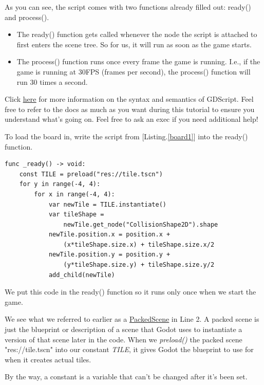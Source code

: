 \documentclass[14pt]{extarticle}
\newcommand{\prettyref}[2]{[{#1}.\ref{#2}]}
\begin{document}
As you can see, the script comes with two functions already filled out: ready() and process().
\begin{itemize}
    \item The ready() function gets called whenever the node the script is attached to first enters the scene tree. So for us, it will run as soon as the game starts.
    \item The process() function runs once every frame the game is running. I.e., if the game is running at 30FPS (frames per second), the process() function will run 30 times a second.
\end{itemize}
Click \href{https://docs.godotengine.org/en/stable/tutorials/scripting/gdscript/index.html#doc-gdscript}{\underline{here}} for more information on the syntax and semantics of GDScript. Feel free to refer to the docs as much as you want during this tutorial to ensure you understand what's going on. Feel free to ask an exec if you need additional help!

To load the board in, write the script from \prettyref{Listing}{board1} into the ready() function.

\begin{lstlisting}[language=gdscript, label={board1}, caption=The code for loading in the board]
func _ready() -> void:
    const TILE = preload("res://tile.tscn")
    for y in range(-4, 4):
        for x in range(-4, 4):
            var newTile = TILE.instantiate()
            var tileShape =
                newTile.get_node("CollisionShape2D").shape
            newTile.position.x = position.x +
                (x*tileShape.size.x) + tileShape.size.x/2
            newTile.position.y = position.y +
                (y*tileShape.size.y) + tileShape.size.y/2
            add_child(newTile)
\end{lstlisting}

We put this code in the ready() function so it runs only once when we start the game.

We see what we referred to earlier as a \href{https://docs.godotengine.org/en/stable/classes/class_packedscene.html}{\underline{PackedScene}} in Line 2. A packed scene is just the blueprint or description of a scene that Godot uses to instantiate a version of that scene later in the code. When we \textit{preload()} the packed scene "res://tile.tscn" into our constant \textit{TILE}, it gives Godot the blueprint to use for when it creates actual tiles.

By the way, a constant is a variable that can't be changed after it's been set.
\end{document}
